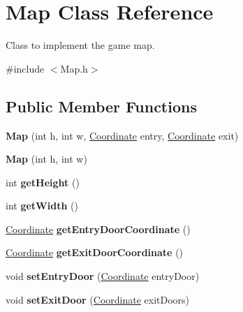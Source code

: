 \hypertarget{classMap}{}\section{Map Class Reference}
\label{classMap}


Class to implement the game map.  




{\ttfamily \#include $<$Map.\+h$>$}

\subsection*{Public Member Functions}
\begin{DoxyCompactItemize}
\item 
\hypertarget{classMap_a3f402a90ac4a9e2c23f7d03baf593cd1}{}\label{classMap_a3f402a90ac4a9e2c23f7d03baf593cd1} 
{\bfseries Map} (int h, int w, \hyperlink{structCoordinate}{Coordinate} entry, \hyperlink{structCoordinate}{Coordinate} exit)
\item 
\hypertarget{classMap_a3bd3343daa6ffb33f400bff5d945a086}{}\label{classMap_a3bd3343daa6ffb33f400bff5d945a086} 
{\bfseries Map} (int h, int w)
\item 
\hypertarget{classMap_a2b09c8875af2efb711fc3a022e70427d}{}\label{classMap_a2b09c8875af2efb711fc3a022e70427d} 
int {\bfseries get\+Height} ()
\item 
\hypertarget{classMap_afd34d12227676b3cebeed9f5fae2508f}{}\label{classMap_afd34d12227676b3cebeed9f5fae2508f} 
int {\bfseries get\+Width} ()
\item 
\hypertarget{classMap_a02e6b6fa2643d26d51c8707b97c8271e}{}\label{classMap_a02e6b6fa2643d26d51c8707b97c8271e} 
\hyperlink{structCoordinate}{Coordinate} {\bfseries get\+Entry\+Door\+Coordinate} ()
\item 
\hypertarget{classMap_a08d73b6cc9dbb0447b550f1c7a9927be}{}\label{classMap_a08d73b6cc9dbb0447b550f1c7a9927be} 
\hyperlink{structCoordinate}{Coordinate} {\bfseries get\+Exit\+Door\+Coordinate} ()
\item 
\hypertarget{classMap_af2fc81e7365bae619097c4996845ed21}{}\label{classMap_af2fc81e7365bae619097c4996845ed21} 
void {\bfseries set\+Entry\+Door} (\hyperlink{structCoordinate}{Coordinate} entry\+Door)
\item 
\hypertarget{classMap_a86022f2db7773e6ea097605ad19f2569}{}\label{classMap_a86022f2db7773e6ea097605ad19f2569} 
void {\bfseries set\+Exit\+Door} (\hyperlink{structCoordinate}{Coordinate} exit\+Doors)
\item 

\end{DoxyCompactItemize}
